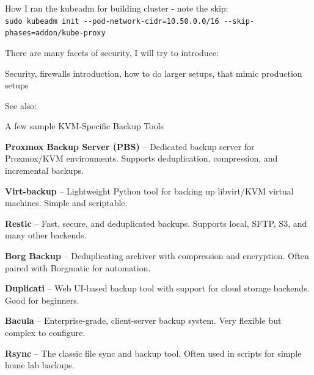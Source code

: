 \documentclass[Screen16to9,17pt]{foils}
\begin{document}
How I ran the kubeadm for building cluster - note the skip:\\
\verb+sudo kubeadm init --pod-network-cidr=10.50.0.0/16 --skip-phases=addon/kube-proxy+




There are many facets of security, I will try to introduce:
\begin{list2}
\item Security, firewalls introduction, how to do larger setups, that mimic production setups

\item See also:
\end{list2}


A few sample KVM-Specific Backup Tools
\begin{list2}
  \item {\bf Proxmox Backup Server (PBS)} -- Dedicated backup server for Proxmox/KVM environments. Supports deduplication, compression, and incremental backups.
  \item {\bf Virt-backup} -- Lightweight Python tool for backing up libvirt/KVM virtual machines. Simple and scriptable.
  \item {\bf Restic} -- Fast, secure, and deduplicated backups. Supports local, SFTP, S3, and many other backends.
  \item {\bf Borg Backup} -- Deduplicating archiver with compression and encryption. Often paired with Borgmatic for automation.
  \item {\bf Duplicati} -- Web UI-based backup tool with support for cloud storage backends. Good for beginners.
  \item {\bf Bacula} -- Enterprise-grade, client-server backup system. Very flexible but complex to configure.
  \item {\bf Rsync} -- The classic file sync and backup tool. Often used in scripts for simple home lab backups.
\end{list2}



\end{document}
